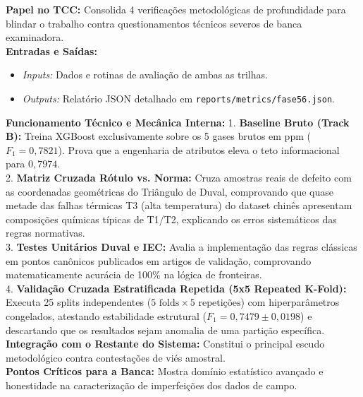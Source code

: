 \documentclass[10pt,a4paper]{article}
\begin{document}
\begin{filebox}
\textbf{Papel no TCC:} Consolida 4 verificações metodológicas de profundidade para blindar o trabalho contra questionamentos técnicos severos de banca examinadora.\\
\textbf{Entradas e Saídas:}
\begin{itemize}[leftmargin=*,itemsep=1pt]
  \item \textit{Inputs:} Dados e rotinas de avaliação de ambas as trilhas.
  \item \textit{Outputs:} Relatório JSON detalhado em \texttt{reports/metrics/fase56.json}.
\end{itemize}
\textbf{Funcionamento Técnico e Mecânica Interna:} 
1. \textbf{Baseline Bruto (Track B):} Treina XGBoost exclusivamente sobre os 5 gases brutos em ppm ($F_1 = 0,7821$). Prova que a engenharia de atributos eleva o teto informacional para $0,7974$.\\
2. \textbf{Matriz Cruzada Rótulo vs. Norma:} Cruza amostras reais de defeito com as coordenadas geométricas do Triângulo de Duval, comprovando que quase metade das falhas térmicas T3 (alta temperatura) do dataset chinês apresentam composições químicas típicas de T1/T2, explicando os erros sistemáticos das regras normativas.\\
3. \textbf{Testes Unitários Duval e IEC:} Avalia a implementação das regras clássicas em pontos canônicos publicados em artigos de validação, comprovando matematicamente acurácia de 100\% na lógica de fronteiras.\\
4. \textbf{Validação Cruzada Estratificada Repetida (5x5 Repeated K-Fold):} Executa 25 splits independentes ($5 \text{ folds} \times 5 \text{ repetições}$) com hiperparâmetros congelados, atestando estabilidade estrutural ($F_1 = 0,7479 \pm 0,0198$) e descartando que os resultados sejam anomalia de uma partição específica.\\
\textbf{Integração com o Restante do Sistema:} Constitui o principal escudo metodológico contra contestações de viés amostral.\\
\textbf{Pontos Críticos para a Banca:} Mostra domínio estatístico avançado e honestidade na caracterização de imperfeições dos dados de campo.
\end{filebox}
\end{document}
